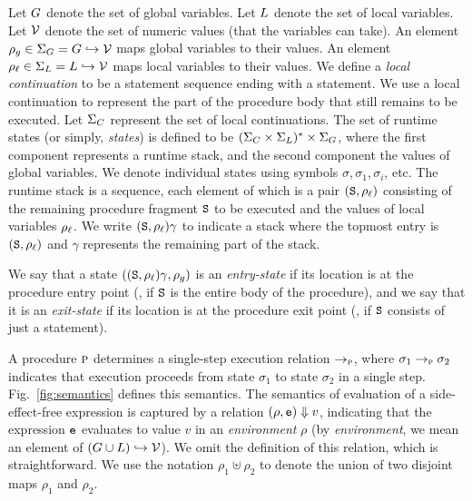 Let $G$ denote the set of global variables. Let $L$ denote the set of local variables.
Let $\mathcal{V}$ denote the set of numeric values (that the variables can take).
An element $\rho_g \in \Sigma_G = G \hookrightarrow \mathcal{V}$ maps global variables to their values.
An element $\rho_\ell \in \Sigma_L = L \hookrightarrow \mathcal{V}$ maps local variables to their values.
We define a \emph{local continuation} to be a statement sequence ending with a  statement.
We use a local continuation to represent the part of the procedure body that still remains to be
executed. Let $\Sigma_C$ represent the set of local continuations.
The set of runtime states (or simply, \emph{states}) is defined to be
$(\Sigma_C \times \Sigma_L)^* \times \Sigma_G$, where the first component
represents a runtime stack, and the second component the values of global
variables. We denote individual states using symbols $\sigma, \sigma_1,
\sigma_i$, etc. The runtime stack is a sequence, each element of which is a pair
$(\texttt{S},\rho_\ell)$ consisting of the remaining procedure fragment $\texttt{S}$ to
be executed and the values of local variables $\rho_\ell$.  We write
$(\texttt{S},\rho_\ell)\gamma$ to indicate a stack where the topmost entry is
$(\texttt{S},\rho_\ell)$ and $\gamma$ represents the remaining part of the stack.

We say that a state $((\texttt{S},\rho_\ell)\gamma,\rho_g)$ is an \emph{entry-state}
if its location is at 
the procedure entry point (\ie, if $\texttt{S}$ is the entire body of the procedure),
and we say that it is an \emph{exit-state} if its location is at the procedure exit point
(\ie, if $\texttt{S}$ consists of just a  statement).

A procedure $\textsc{p}$ determines a single-step execution relation
$\rightarrow_{\textsc{p}}$, where $\sigma_1 \rightarrow_{\textsc{p}} \sigma_2$ indicates that
execution proceeds from state $\sigma_1$ to state $\sigma_2$ in a single
step.  Fig.~\ref{fig:semantics} defines this semantics.  The semantics of
evaluation of a side-effect-free expression is captured by a relation
$({\rho},{\texttt{e}}) \Downarrow {v}$, indicating that the expression $\texttt{e}$
evaluates to value $v$ in an \emph{environment} $\rho$ (by
\emph{environment}, we mean an
element of  $(G \cup L) \hookrightarrow \mathcal{V}$).  We omit the definition of this
relation, which is straightforward.  We use the notation $\rho_1 \uplus
\rho_2$ to denote the union of two disjoint maps $\rho_1$ and $\rho_2$.


